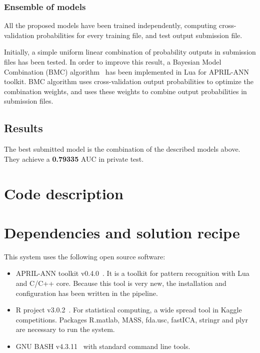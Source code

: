 \documentclass[a4paper,english,twoside]{article}
\begin{document}
\subsubsection{Ensemble of models}\label{ensemble-of-models}

All the proposed models have been trained independently, computing
cross-validation probabilities for every training file, and test output
submission file.

Initially, a simple uniform linear combination of probability outputs in
submission files has been tested. In order to improve this result, a Bayesian
Model Combination (BMC) algorithm~\cite{2011:monteith:ijcnn} has been
implemented in Lua for APRIL-ANN~\cite{aprilann} toolkit. BMC algorithm uses
cross-validation output probabilities to optimize the combination weights, and
uses these weights to combine output probabilities in submission files.

\subsection{Results}\label{results}

The best submitted model is the combination of the described models
above. They achieve a \textbf{0.79335} AUC in private test.

\section{Code description}\label{code-description}

\section{Dependencies and solution recipe}\label{dependencies}

This system uses the following open source software:

\begin{itemize}
\item APRIL-ANN toolkit v0.4.0~\cite{aprilann}.
  It is a toolkit for pattern recognition with Lua and C/C++ core.
  Because this tool is very new, the installation and configuration has
  been written in the pipeline.
\item R project v3.0.2~\cite{Rproject}. For statistical
  computing, a wide spread tool in Kaggle competitions. Packages
  R.matlab, MASS, fda.usc, fastICA, stringr and plyr are necessary to
  run the system.
\item GNU BASH v4.3.11~\cite{bash} with standard command line tools.
\end{itemize}
\end{document}
